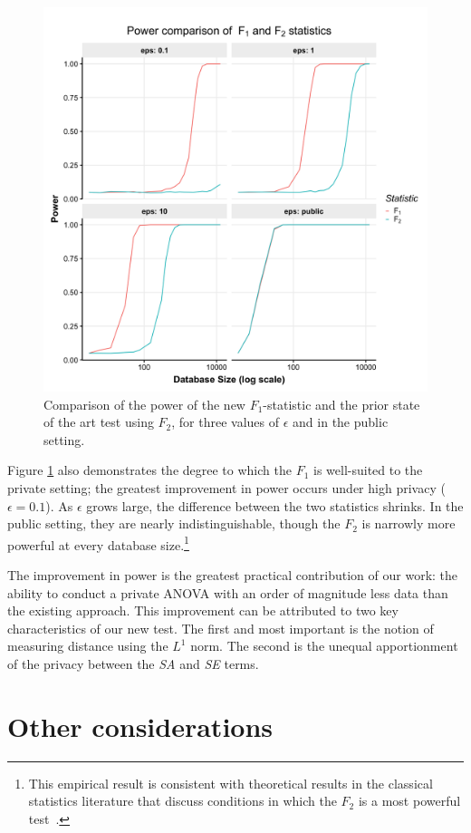 \documentclass[USenglish,oneside]{article}
\newcounter{ag}
\newcounter{ab}
\newcounter{ar}
\newcounter{igh}
\newcounter{ms}
\newcommand{\se}{\textit{SE}\xspace}
\newcommand{\sa}{\textit{SA}\xspace}
\begin{document}
\begin{figure}
\centering
\includegraphics[width=.8\linewidth]{images/f1-vs-f2-quartet.png}
\caption{Comparison of the power of the new $F_1$-statistic and the prior state of the art test using $F_2$, for three values of $\epsilon$ and in the public setting.\label{Fig:f1-vs-f2}}
\end{figure}

Figure \ref{Fig:f1-vs-f2} also demonstrates the degree to which the $F_1$ is well-suited to the private setting; the greatest improvement in power occurs under high privacy ($\epsilon = 0.1$). As $\epsilon$ grows large, the difference between the two statistics shrinks. In the public setting, they are nearly indistinguishable, though the $F_2$ is narrowly more powerful at every database size.\footnote{This empirical result is consistent with theoretical results in the classical statistics literature that discuss conditions in which the $F_2$ is a most powerful test~\cite{cox1974theoretical}.}

The improvement in power is the greatest practical contribution of our work: the ability to conduct a private ANOVA with an order of magnitude less data than the existing approach. This improvement can be attributed to two key characteristics of our new test. The first and most important is the notion of measuring distance using the $L^1$ norm.  The second is the unequal apportionment of the privacy between the \sa and \se terms.


\section{Other considerations}
\label{sec:considerations}
\end{document}
